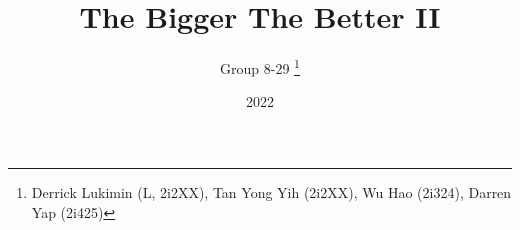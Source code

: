 \documentclass[11pt]{article}
\title{The Bigger The Better II}
\author{Group 8-29 \thanks{Derrick Lukimin (L, 2i2XX), Tan Yong Yih (2i2XX), Wu Hao (2i324), Darren Yap (2i425)}}
\date{2022}
\begin{document}
\onehalfspacing
\maketitle
\end{document}
